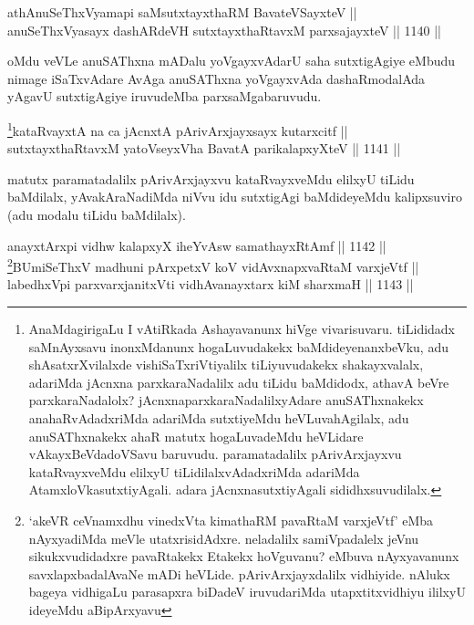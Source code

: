 \begin{shl}
athAnuSeThxVyamapi saMsutxtayxthaRM BavateVSayxteV || \\
anuSeThxVyasayx dashARdeVH sutxtayxthaRtavxM parxsajayxteV \hfill || 1140 ||  
\end{shl}

\begin{artha}
oMdu veVLe anuSAThxna mADalu yoVgayxvAdarU saha sutxtigAgiye eMbudu nimage iSaTxvAdare AvAga anuSAThxna yoVgayxvAda dashaRmodalAda yAgavU sutxtigAgiye iruvudeMba parxsaMgabaruvudu.
\end{artha}


\begin{shl}
\footnote{AnaMdagirigaLu I vAtiRkada Ashayavanunx hiVge vivarisuvaru. tiLididadx saMnAyxsavu inonxMdanunx hogaLuvudakekx baMdideyenanxbeVku, adu shAsatxrXvilalxde vishiSaTxriVtiyalilx tiLiyuvudakekx shakayxvalalx, adariMda jAcnxna parxkaraNadalilx adu tiLidu baMdidodx, athavA beVre parxkaraNadalolx? jAcnxnaparxkaraNadalilxyAdare anuSAThxnakekx anahaRvAdadxriMda adariMda sutxtiyeMdu heVLuvahAgilalx, adu anuSAThxnakekx ahaR matutx hogaLuvadeMdu heVLidare vAkayxBeVdadoVSavu baruvudu. paramatadalilx pArivArxjayxvu kataRvayxveMdu elilxyU tiLidilalxvAdadxriMda adariMda AtamxloVkasutxtiyAgali. adara jAcnxnasutxtiyAgali sididhxsuvudilalx.}kataRvayxtA na ca jAcnxtA pArivArxjayxsayx kutarxcitf ||  \\
sutxtayxthaRtavxM yatoV\s seyxVha BavatA parikalapxyXteV \hfill || 1141 ||  
\end{shl}

\begin{artha}
matutx paramatadalilx pArivArxjayxvu kataRvayxveMdu elilxyU tiLidu baMdilalx, yAvakAraNadiMda niVvu idu sutxtigAgi baMdideyeMdu kalipxsuviro (adu modalu tiLidu baMdilalx).
\end{artha}


\begin{shl}
anayxtArxpi vidhw kalapxyX iheYvAsw samathayxRtAmf \hfill || 1142 || \\
\footnote{`akeVR ceVnamxdhu vinedxVta kimathaRM pavaRtaM varxjeVtf' eMba nAyxyadiMda meVle utatxrisidAdxre. neladalilx samiVpadalelx jeVnu sikukxvudidadxre pavaRtakekx Etakekx hoVguvanu? eMbuva nAyxyavanunx savxlapxbadalAvaNe mADi heVLide. pArivArxjayxdalilx vidhiyide. nAlukx bageya vidhigaLu parasapxra biDadeV iruvudariMda utapxtitxvidhiyu ililxyU ideyeMdu aBipArxyavu}BUmiSeThxV madhuni pArxpetxV koV vidAvxnapxvaRtaM varxjeVtf || \\
labedhxV\s pi parxvarxjanitxVti vidhAvanayxtarx kiM sharxmaH \hfill || 1143 ||  
\end{shl}

